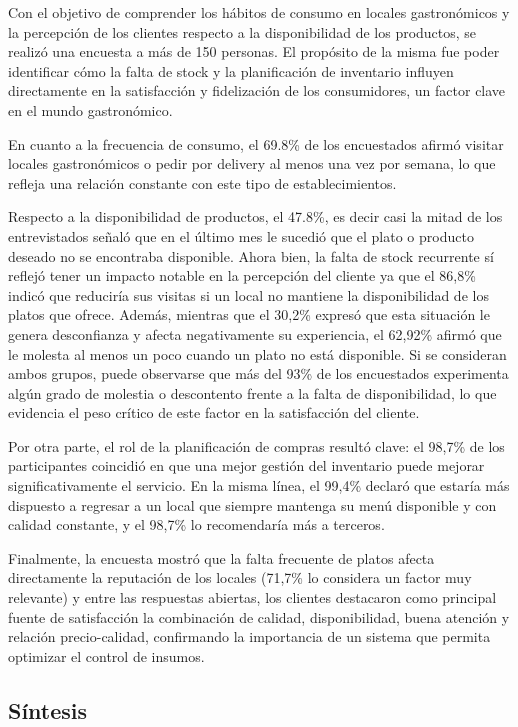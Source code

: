 Con el objetivo de comprender los hábitos de consumo en locales gastronómicos y la percepción de los clientes respecto a la disponibilidad de los productos, se realizó una encuesta a más de 150 personas. El propósito de la misma fue poder identificar cómo la falta de stock y la planificación de inventario influyen directamente en la satisfacción y fidelización de los consumidores, un factor clave en el mundo gastronómico.

En cuanto a la frecuencia de consumo, el 69.8\% de los encuestados afirmó visitar locales gastronómicos o pedir por delivery al menos una vez por semana, lo que refleja una relación constante con este tipo de establecimientos.

Respecto a la disponibilidad de productos, el 47.8\%, es decir casi la mitad de los entrevistados señaló que en el último mes le sucedió que el plato o producto deseado no se encontraba disponible. Ahora bien, la falta de stock recurrente sí reflejó tener un impacto notable en la percepción del cliente ya que el 86,8\% indicó que reduciría sus visitas si un local no mantiene la disponibilidad de los platos que ofrece. Además, mientras que el 30,2\% expresó que esta situación le genera desconfianza y afecta negativamente su experiencia, el 62,92\% afirmó que le molesta al menos un poco cuando un plato no está disponible. Si se consideran ambos grupos, puede observarse que más del 93\% de los encuestados experimenta algún grado de molestia o descontento frente a la falta de disponibilidad, lo que evidencia el peso crítico de este factor en la satisfacción del cliente.

Por otra parte, el rol de la planificación de compras resultó clave: el 98,7\% de los participantes coincidió en que una mejor gestión del inventario puede mejorar significativamente el servicio. En la misma línea, el 99,4\% declaró que estaría más dispuesto a regresar a un local que siempre mantenga su menú disponible y con calidad constante, y el 98,7\% lo recomendaría más a terceros.

Finalmente, la encuesta mostró que la falta frecuente de platos afecta directamente la reputación de los locales (71,7\% lo considera un factor muy relevante) y entre las respuestas abiertas, los clientes destacaron como principal fuente de satisfacción la combinación de calidad, disponibilidad, buena atención y relación precio-calidad, confirmando la importancia de un sistema que permita optimizar el control de insumos.

\subsection{Síntesis}\label{sec:sintesis-user-research}

